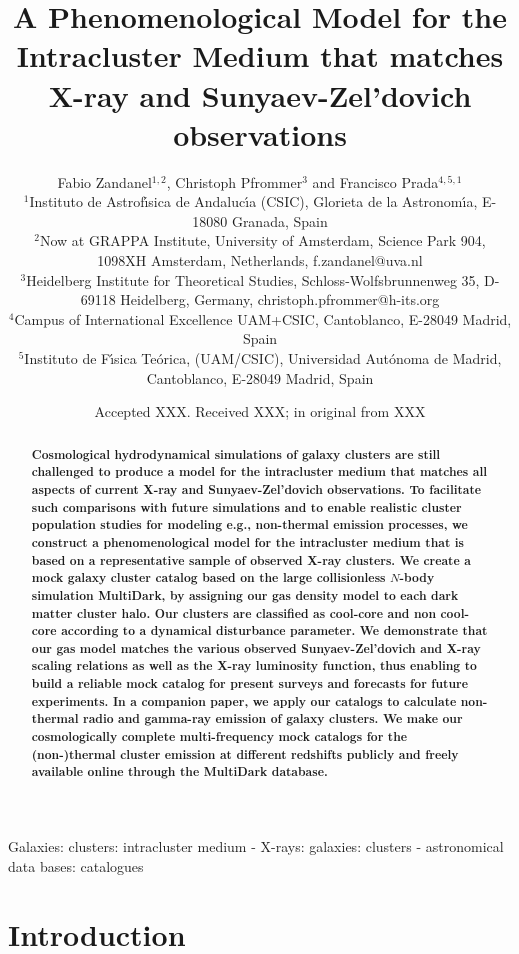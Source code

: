 \documentclass[useAMS,usenatbib]{mn2e}
\title[A Phenomenological Model for the Intracluster Medium]{A Phenomenological Model for the Intracluster Medium that matches X-ray and Sunyaev-Zel'dovich observations}
\author[F. Zandanel, C. Pfrommer and F. Prada]{
Fabio Zandanel$^{1,2}$, Christoph Pfrommer$^{3}$ and Francisco Prada$^{4,5,1}$\\
$^{1}$Instituto de Astrof\'{\i}sica de Andaluc\'{\i}a (CSIC), Glorieta de la Astronom\'{\i}a, E-18080 Granada, Spain\\
$^{2}$Now at GRAPPA Institute, University of Amsterdam, Science Park 904, 1098XH Amsterdam, Netherlands, f.zandanel@uva.nl\\
$^{3}$Heidelberg Institute for Theoretical Studies, Schloss-Wolfsbrunnenweg 35, D-69118 Heidelberg, Germany, christoph.pfrommer@h-its.org\\
$^{4}$Campus of International Excellence UAM+CSIC, Cantoblanco, E-28049 Madrid, Spain\\
$^{5}$Instituto de F\'{\i}sica Te\'orica, (UAM/CSIC), Universidad Aut\'onoma de Madrid, Cantoblanco, E-28049 Madrid, Spain}
\begin{document}
\date{Accepted XXX. Received XXX; in original from XXX}

\pagerange{\pageref{firstpage}--\pageref{lastpage}} 

\maketitle

\label{firstpage}

\begin{abstract}
  {\bf Cosmological hydrodynamical simulations of galaxy clusters are still
    challenged to produce a model for the intracluster medium that matches all
    aspects of current X-ray and Sunyaev-Zel'dovich observations. To facilitate
    such comparisons with future simulations and to enable realistic cluster
    population studies for modeling e.g., non-thermal emission processes, we
    construct a phenomenological model for the intracluster medium that is based
    on a representative sample of observed X-ray clusters. We create a mock
    galaxy cluster catalog based on the large collisionless $N$-body simulation
    MultiDark, by assigning our gas density model to each dark matter cluster
    halo.  Our clusters are classified as cool-core and non cool-core according
    to a dynamical disturbance parameter. We demonstrate that our gas model
    matches the various observed Sunyaev-Zel'dovich and X-ray scaling relations
    as well as the X-ray luminosity function, thus enabling to build a reliable
    mock catalog for present surveys and forecasts for future experiments. In a
    companion paper, we apply our catalogs to calculate non-thermal radio and
    gamma-ray emission of galaxy clusters. We make our cosmologically complete
    multi-frequency mock catalogs for the (non-)thermal cluster emission at
    different redshifts publicly and freely available online through the
    MultiDark database.}
\end{abstract}

\begin{keywords}
  Galaxies: clusters: intracluster medium - X-rays: galaxies: clusters - astronomical data bases: catalogues
\end{keywords}


\section{Introduction}
\label{sec:1}
\end{document}
